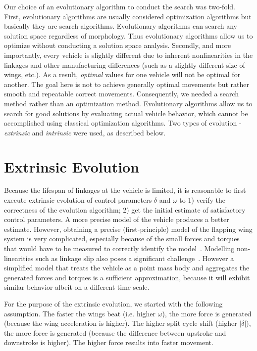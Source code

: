 Our choice of an evolutionary algorithm to conduct the search was two-fold. First, evolutionary algorithms are usually considered optimization algorithms but basically they are search algorithms. Evolutionary algorithms can search any solution space regardless of morphology. Thus evolutionary algorithms allow us to optimize without conducting a solution space analysis. Secondly, and more importantly, every vehicle is slightly different due to inherent nonlinearities in the linkages and other manufacturing differences (such as a slightly different size of wings, etc.). As a result, \textit{optimal} values for one vehicle will not be optimal for another. The goal here is not to achieve generally optimal movements but rather smooth and repeatable correct movements. Consequently, we needed a search method rather than an optimization method. Evolutionary algorithms allow us to search for good solutions by evaluating actual vehicle behavior, which cannot be accomplished using classical optimization algorithms. Two types of evolution - \textit{extrinsic} and \textit{intrinsic} were used, as described below.

\section{Extrinsic Evolution}
\label{subsec-extrinsic}
Because the lifespan of linkages at the vehicle is limited, it is reasonable to first execute extrinsic evolution of control parameters $\delta$ and $\omega$ to 1) verify the correctness of the evolution algorithm; 2) get the initial estimate of satisfactory control parameters. A more precise model of the vehicle produces a better estimate. However, obtaining a precise (first-principle) model of the flapping wing system is very complicated, especially because of the small forces and torques that would have to be measured to correctly identify the model~\cite{Finio2011}. Modelling non-linearities such as linkage slip also poses a significant challenge~\cite{Vm2015}. However a simplified model that treats the vehicle as a point mass body and aggregates the generated forces and torques is a sufficient approximation, because it will exhibit similar behavior albeit on a different time scale.

For the purpose of the extrinsic evolution, we started with the following assumption. The faster the wings beat (i.e. higher $\omega$), the more force is generated (because the wing acceleration is higher). The higher split cycle shift (higher $|\delta|$), the more force is generated (because the difference between upstroke and downstroke is higher). The higher force results into faster movement.

